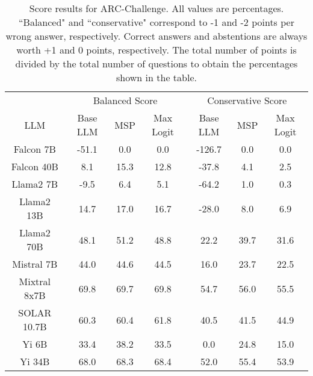 \begin{table*}
\centering
\begin{tabular}{c|c|c|c|c|c|c}
& \multicolumn{3}{c|}{Balanced Score} & \multicolumn{3}{c}{Conservative Score} \\ 
LLM & Base LLM & MSP & Max Logit & Base LLM & MSP & Max Logit\\ \hline
Falcon 7B & -51.1 & 0.0 & 0.0 & -126.7 & 0.0 & 0.0\\
Falcon 40B & 8.1 & 15.3 & 12.8 & -37.8 & 4.1 & 2.5\\
Llama2 7B & -9.5 & 6.4 & 5.1 & -64.2 & 1.0 & 0.3\\
Llama2 13B & 14.7 & 17.0 & 16.7 & -28.0 & 8.0 & 6.9\\
Llama2 70B & 48.1 & 51.2 & 48.8 & 22.2 & 39.7 & 31.6\\
Mistral 7B & 44.0 & 44.6 & 44.5 & 16.0 & 23.7 & 22.5\\
Mixtral 8x7B & 69.8 & 69.7 & 69.8 & 54.7 & 56.0 & 55.5\\
SOLAR 10.7B & 60.3 & 60.4 & 61.8 & 40.5 & 41.5 & 44.9\\
Yi 6B & 33.4 & 38.2 & 33.5 & 0.0 & 24.8 & 15.0\\
Yi 34B & 68.0 & 68.3 & 68.4 & 52.0 & 55.4 & 53.9\\
\hline
\end{tabular}
\caption{Score results for ARC-Challenge. All values are percentages. ``Balanced" and ``conservative" correspond to -1 and -2 points per wrong answer, respectively. Correct answers and abstentions are always worth +1 and 0 points, respectively. The total number of points is divided by the total number of questions to obtain the percentages shown in the table.}
\label{tab:arc_score}
\end{table*}
